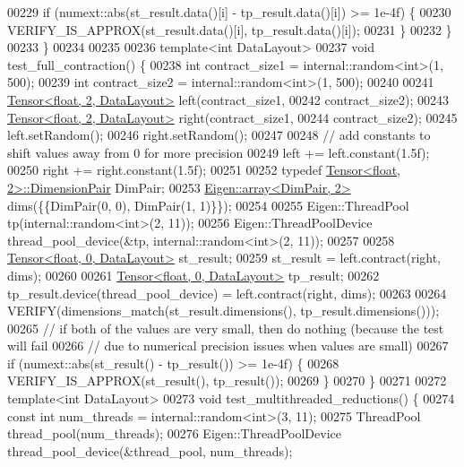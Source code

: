 \begin{DoxyCode}
00229     \textcolor{keywordflow}{if} (numext::abs(st\_result.data()[i] - tp\_result.data()[i]) >= 1e-4f) \{
00230       VERIFY\_IS\_APPROX(st\_result.data()[i], tp\_result.data()[i]);
00231     \}
00232   \}
00233 \}
00234 
00235 
00236 \textcolor{keyword}{template}<\textcolor{keywordtype}{int} DataLayout>
00237 \textcolor{keywordtype}{void} test\_full\_contraction() \{
00238   \textcolor{keywordtype}{int} contract\_size1 = internal::random<int>(1, 500);
00239   \textcolor{keywordtype}{int} contract\_size2 = internal::random<int>(1, 500);
00240 
00241   \hyperlink{class_eigen_1_1_tensor}{Tensor<float, 2, DataLayout>} left(contract\_size1,
00242                                     contract\_size2);
00243   \hyperlink{class_eigen_1_1_tensor}{Tensor<float, 2, DataLayout>} right(contract\_size1,
00244                                     contract\_size2);
00245   left.setRandom();
00246   right.setRandom();
00247 
00248   \textcolor{comment}{// add constants to shift values away from 0 for more precision}
00249   left += left.constant(1.5f);
00250   right += right.constant(1.5f);
00251 
00252   \textcolor{keyword}{typedef} \hyperlink{class_eigen_1_1_tensor}{Tensor<float, 2>::DimensionPair} DimPair;
00253   \hyperlink{class_eigen_1_1array}{Eigen::array<DimPair, 2>} dims(\{\{DimPair(0, 0), DimPair(1, 1)\}\});
00254 
00255   Eigen::ThreadPool tp(internal::random<int>(2, 11));
00256   Eigen::ThreadPoolDevice thread\_pool\_device(&tp, internal::random<int>(2, 11));
00257 
00258   \hyperlink{class_eigen_1_1_tensor}{Tensor<float, 0, DataLayout>} st\_result;
00259   st\_result = left.contract(right, dims);
00260 
00261   \hyperlink{class_eigen_1_1_tensor}{Tensor<float, 0, DataLayout>} tp\_result;
00262   tp\_result.device(thread\_pool\_device) = left.contract(right, dims);
00263 
00264   VERIFY(dimensions\_match(st\_result.dimensions(), tp\_result.dimensions()));
00265   \textcolor{comment}{// if both of the values are very small, then do nothing (because the test will fail}
00266   \textcolor{comment}{// due to numerical precision issues when values are small)}
00267   \textcolor{keywordflow}{if} (numext::abs(st\_result() - tp\_result()) >= 1e-4f) \{
00268     VERIFY\_IS\_APPROX(st\_result(), tp\_result());
00269   \}
00270 \}
00271 
00272 \textcolor{keyword}{template}<\textcolor{keywordtype}{int} DataLayout>
00273 \textcolor{keywordtype}{void} test\_multithreaded\_reductions() \{
00274   \textcolor{keyword}{const} \textcolor{keywordtype}{int} num\_threads = internal::random<int>(3, 11);
00275   ThreadPool thread\_pool(num\_threads);
00276   Eigen::ThreadPoolDevice thread\_pool\_device(&thread\_pool, num\_threads);

\end{DoxyCode}
